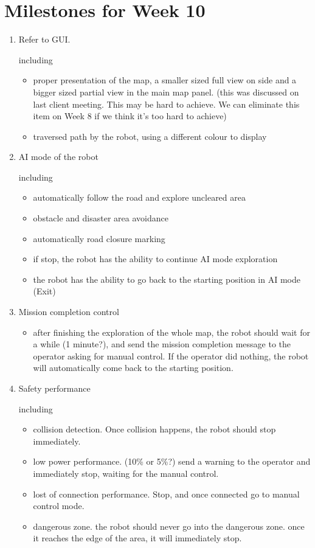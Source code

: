 \documentclass[11pt, a4paper]{article}
\begin{document}
\section{Milestones for Week 10}

\begin{enumerate}

\item Refer to GUI.

including

\begin {itemize}
\item proper presentation of the map, a smaller sized full view on side and a bigger sized partial view in the main map panel. (this was discussed on last client meeting. This may be hard to achieve. We can eliminate this item on Week 8 if we think it's too hard to achieve)
\item traversed path by the robot, using a different colour to display
\end {itemize}

\item AI mode of the robot

including
\begin {itemize}
\item automatically follow the road and explore uncleared area
\item obstacle and disaster area avoidance
\item automatically road closure marking
\item if stop, the robot has the ability to continue AI mode exploration
\item the robot has the ability to go back to the starting position in AI mode (Exit)
\end {itemize}

\item Mission completion control

\begin {itemize}
\item after finishing the exploration of the whole map, the robot should wait for a while (1 minute?), and send the mission completion message to the operator asking for manual control. If the operator did nothing, the robot will automatically come back to the starting position.
\end {itemize}

\item Safety performance

including

\begin {itemize}
\item collision detection. Once collision happens, the robot should stop immediately.
\item low power performance. (10\% or 5\%?) send a warning to the operator and immediately stop, waiting for the manual control.
\item lost of connection performance. Stop, and once connected go to manual control mode.
\item dangerous zone. the robot should never go into the dangerous zone. once it reaches the edge of the area, it will immediately stop.
\end {itemize}


\end{enumerate}
\end{document}
